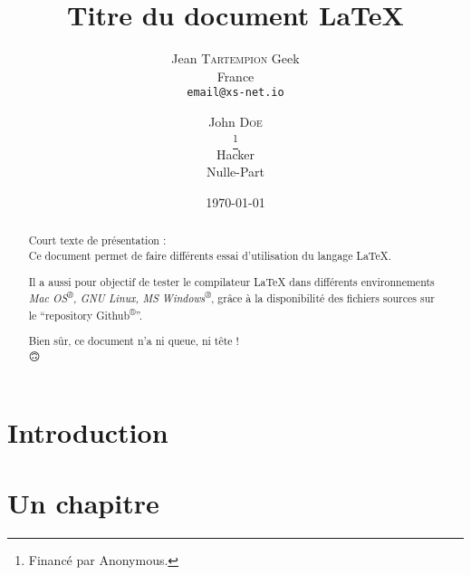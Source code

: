 \documentclass[frenchb, 12pt, twoside, a4paper]{article}
\title{Titre du document \LaTeX{}}
\author{
  Jean \textsc{Tartempion}
  Geek \\
  France \\
  \texttt{email@xs-net.io} \\           %
  \and
  John \textsc{Doe} \\
  \thanks{Financé par Anonymous.} \\    %
  Hacker \\
  Nulle-Part
  }
\date{\today}                           %
\begin{document}
\maketitle                              %

{
\renewcommand{\contentsname}{Sommaire}  %
\tableofcontents                        %
}


\begin{abstract}
  Court texte de présentation : \\
  Ce document permet de faire différents essai d'utilisation
  du langage \LaTeX{}.
  
  Il a aussi pour objectif de tester le compilateur \LaTeX{}
  dans différents environnements 
  \emph{Mac OS\textsuperscript{®}, GNU Linux, MS Windows\textsuperscript{®}},
  grâce à la disponibilité des fichiers sources sur le 
  \enquote{repository Github\textsuperscript{®}}.
  
  Bien sûr, ce document n'a ni queue, ni tête ! \\
  \Large{🙃}
\end{abstract}



\section*{Introduction}



\section{Un chapitre}

\end{document}
